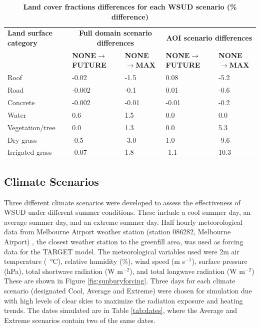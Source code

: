 \documentclass[final,3p,times,authoryear]{elsarticle}
\begin{document}
\begin{table}[!htbp]
\caption{\bf Land cover fractions differences for each WSUD scenario (\% difference)  \label{tab:parametersDiff}}     
\begin{tabular}{ l l l l l }
\hline  \textbf{Land surface category } &  \multicolumn{2}{|c|}{\textbf{Full domain scenario differences}} & \multicolumn{2}{c|}{\textbf{AOI scenario differences}}  \\ 
\textbf{} & \textbf{NONE$\rightarrow$FUTURE}   & \textbf{NONE$\rightarrow$MAX}& \textbf{NONE$\rightarrow$FUTURE} &  \textbf{NONE$\rightarrow$MAX}  \\ \hline
Roof	&-0.02&-1.5&0.08&-5.2\\		
Road	&-0.002&-0.1&0.01&-0.6\\		
Concrete&-0.002&-0.01&-0.01&-0.2\\	
Water	&0.6&1.5&0.0&0.0\\
Vegetation/tree &0.0&1.3&0.0&5.3\\
Dry grass &-0.5&-3.0&1.0&-9.6\\
Irrigated grass	&-0.07&1.8&-1.1&10.3\\	
\hline
\end{tabular}
\end{table}








\subsection{Climate Scenarios}\label{sec:methods_climate_scenarios}

Three different climate scenarios were developed to assess the effectiveness of WSUD under different summer conditions. These include a cool summer day, an average summer day, and an extreme summer day. Half hourly meteorological data from Melbourne Airport weather station (station 086282, Melbourne Airport) \citep{BOM2016b}, the closest weather station to the greenfill area, was used as forcing data for the TARGET model. The meteorological variables used were 2m air temperature (\SI{}{\degreeCelsius}), relative humidity (\%), wind speed (m s$^{-1}$), surface pressure (hPa), total shortwave radiation (W m$^{-2}$), and total longwave radiation (W m$^{-2}$) These are shown in Figure \ref{fig:sunburyforcing}. Three days for each climate scenario (designated Cool, Average and Extreme) were chosen for simulation due with high levels of clear skies to maximize the radiation exposure and heating trends. The dates simulated are in Table \ref{tab:dates}, where the Average and Extreme scenarios contain two of the same dates.
\end{document}
